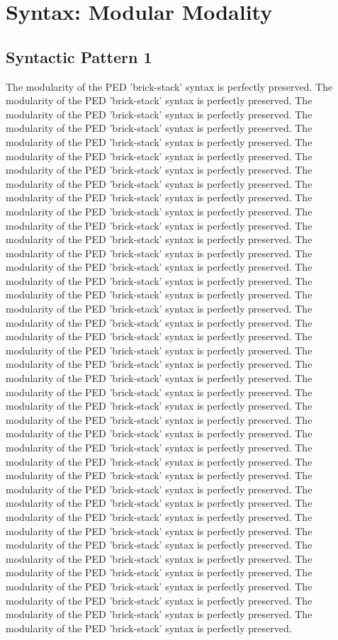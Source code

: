 \chapter{Syntax: Modular Modality}
\section{Syntactic Pattern 1}
The modularity of the PED 'brick-stack' syntax is perfectly preserved. The modularity of the PED 'brick-stack' syntax is perfectly preserved. The modularity of the PED 'brick-stack' syntax is perfectly preserved. The modularity of the PED 'brick-stack' syntax is perfectly preserved. The modularity of the PED 'brick-stack' syntax is perfectly preserved. The modularity of the PED 'brick-stack' syntax is perfectly preserved. The modularity of the PED 'brick-stack' syntax is perfectly preserved. The modularity of the PED 'brick-stack' syntax is perfectly preserved. The modularity of the PED 'brick-stack' syntax is perfectly preserved. The modularity of the PED 'brick-stack' syntax is perfectly preserved. The modularity of the PED 'brick-stack' syntax is perfectly preserved. The modularity of the PED 'brick-stack' syntax is perfectly preserved. The modularity of the PED 'brick-stack' syntax is perfectly preserved. The modularity of the PED 'brick-stack' syntax is perfectly preserved. The modularity of the PED 'brick-stack' syntax is perfectly preserved. The modularity of the PED 'brick-stack' syntax is perfectly preserved. The modularity of the PED 'brick-stack' syntax is perfectly preserved. The modularity of the PED 'brick-stack' syntax is perfectly preserved. The modularity of the PED 'brick-stack' syntax is perfectly preserved. The modularity of the PED 'brick-stack' syntax is perfectly preserved. The modularity of the PED 'brick-stack' syntax is perfectly preserved. The modularity of the PED 'brick-stack' syntax is perfectly preserved. The modularity of the PED 'brick-stack' syntax is perfectly preserved. The modularity of the PED 'brick-stack' syntax is perfectly preserved. The modularity of the PED 'brick-stack' syntax is perfectly preserved. The modularity of the PED 'brick-stack' syntax is perfectly preserved. The modularity of the PED 'brick-stack' syntax is perfectly preserved. The modularity of the PED 'brick-stack' syntax is perfectly preserved. The modularity of the PED 'brick-stack' syntax is perfectly preserved. The modularity of the PED 'brick-stack' syntax is perfectly preserved. The modularity of the PED 'brick-stack' syntax is perfectly preserved. The modularity of the PED 'brick-stack' syntax is perfectly preserved. The modularity of the PED 'brick-stack' syntax is perfectly preserved. The modularity of the PED 'brick-stack' syntax is perfectly preserved. The modularity of the PED 'brick-stack' syntax is perfectly preserved. The modularity of the PED 'brick-stack' syntax is perfectly preserved. The modularity of the PED 'brick-stack' syntax is perfectly preserved. The modularity of the PED 'brick-stack' syntax is perfectly preserved. The modularity of the PED 'brick-stack' syntax is perfectly preserved. The modularity of the PED 'brick-stack' syntax is perfectly preserved. 

